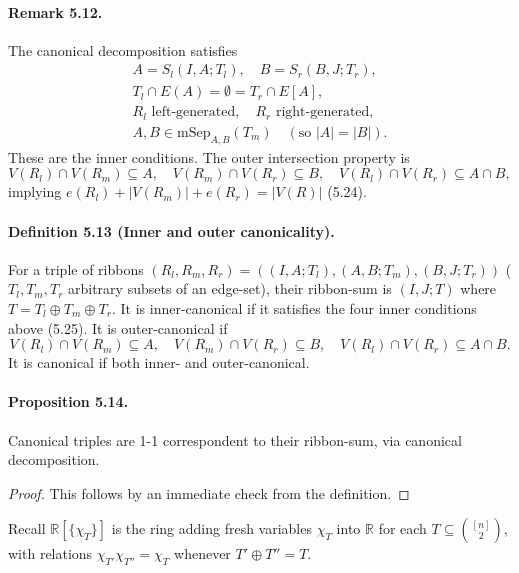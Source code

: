 \paragraph{Remark 5.12.} The canonical decomposition satisfies
\begin{gather*}A=S_l(I,A;T_l),\quad B=S_r(B,J;T_r),\\T_l\cap E(A)=\emptyset=T_r\cap E[A],\\R_l\text{ left-generated},\quad R_r\text{ right-generated},\\A,B\in\mathrm{mSep}_{A,B}(T_m)\quad(\text{so }|A|=|B|).
\end{gather*}
These are the inner conditions. The outer intersection property is
\[V(R_l)\cap V(R_m)\subseteq A,\quad V(R_m)\cap V(R_r)\subseteq B,\quad V(R_l)\cap V(R_r)\subseteq A\cap B,\]
implying $e(R_l)+|V(R_m)|+e(R_r)=|V(R)|$ (5.24).
\paragraph{Definition 5.13 (Inner and outer canonicality).} For a triple of ribbons $(R_l,R_m,R_r)=((I,A;T_l),(A,B;T_m),(B,J;T_r))$ ($T_l,T_m,T_r$ arbitrary subsets of an edge-set), their ribbon-sum is $(I,J;T)$ where $T=T_l\oplus T_m\oplus T_r$. It is inner-canonical if it satisfies the four inner conditions above (5.25). It is outer-canonical if
\[V(R_l)\cap V(R_m)\subseteq A,\quad V(R_m)\cap V(R_r)\subseteq B,\quad V(R_l)\cap V(R_r)\subseteq A\cap B.\tag{5.26}\]
It is canonical if both inner- and outer-canonical.
\paragraph{Proposition 5.14.} Canonical triples are 1-1 correspondent to their ribbon-sum, via canonical decomposition.
\begin{proof}This follows by an immediate check from the definition.\end{proof}
Recall $\mathbb R[\{\chi_T\}]$ is the ring adding fresh variables $\chi_T$ into $\mathbb R$ for each $T\subseteq\binom{[n]}2$, with relations $\chi_{T'}\chi_{T''}=\chi_T$ whenever $T'\oplus T''=T$.

